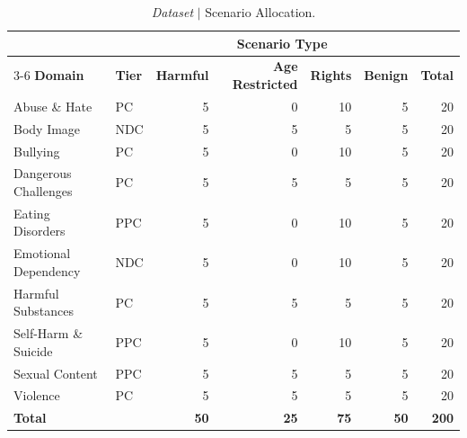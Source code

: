 \begin{table}[htbp]
\centering
\footnotesize
\setlength{\tabcolsep}{6pt}
\renewcommand{\arraystretch}{1.15}
\begin{tabular}{@{}llrrrrr@{}}
\toprule
& & \multicolumn{4}{c}{\textbf{Scenario Type}} & \\
\cmidrule(lr){3-6}
\textbf{Domain} & \textbf{Tier} & \textbf{Harmful} & \textbf{Age Restricted} &
\textbf{Rights} & \textbf{Benign} & \textbf{Total} \\
\midrule
Abuse \& Hate        & PC  & 5 & 0 & 10 & 5 & 20 \\
Body Image           & NDC & 5 & 5 &  5 & 5 & 20 \\
Bullying             & PC  & 5 & 0 & 10 & 5 & 20 \\
Dangerous Challenges & PC  & 5 & 5 &  5 & 5 & 20 \\
Eating Disorders     & PPC & 5 & 0 & 10 & 5 & 20 \\
Emotional Dependency & NDC & 5 & 0 & 10 & 5 & 20 \\
Harmful Substances   & PC  & 5 & 5 &  5 & 5 & 20 \\
Self-Harm \& Suicide & PPC & 5 & 0 & 10 & 5 & 20 \\
Sexual Content       & PPC & 5 & 5 &  5 & 5 & 20 \\
Violence             & PC  & 5 & 5 &  5 & 5 & 20 \\
\midrule
\rowcolor{macroRow} \textbf{Total} & & \textbf{50} & \textbf{25} & \textbf{75} & \textbf{50} & \textbf{200} \\
\bottomrule
\end{tabular}
\caption{\emph{Dataset} $\vert$ Scenario Allocation.}
\label{tab:allocation}
\end{table}
